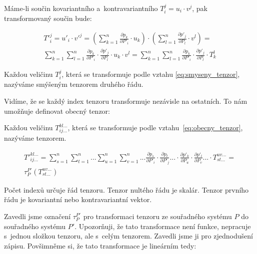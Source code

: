 Máme-li součin kovariantního a~kontravariantního \(T_i^j = u_i \cdot v^j\), pak transformovaný součin bude:

\begin{equation}
\label{eq:smyseny_tenzor}
\begin{split}
T'^j_i = u'_i \cdot v'^j = (\sum_{k=1}^n \frac{\partial p_k}{\partial P'_i} \cdot u_k) \cdot (\sum_{l=1}^n \frac{\partial p'_j}{\partial P_l} \cdot v^l) = \\
\sum_{k=1}^n \sum_{l=1}^n \frac{\partial p_k}{\partial P'_i} \cdot \frac{\partial p'_j}{\partial P_l} \cdot u_k \cdot v^l = \sum_{k=1}^n \sum_{l=1}^n \frac{\partial p_k}{\partial P'_i} \cdot \frac{\partial p'_j}{\partial P_l} \cdot T_k^l
\end{split}
\end{equation}

Každou veličinu \(T_i^j\), která se transformuje podle vztahu \eqref{eq:smyseny_tenzor}, nazýváme smýšeným tenzorem druhého řádu.

Vidíme, že se každý index tenzoru transformuje nezávisle na ostatních. To nám umožňuje definovat obecný tenzor:

\begin{fact}

Každou veličinu \(T_{ij...}^{kl...}\), která se transformuje podle vztahu~\eqref{eq:obecny_tenzor}, nazýváme tenzorem.

\begin{equation}
\label{eq:obecny_tenzor}
\begin{split}
T'^{kl...}_{ij...} = \sum_{s=1}^n \sum_{t=1}^n ... \sum_{u=1}^n \sum_{v=1}^n ... \frac{\partial p_s}{\partial P'_i} \cdot \frac{\partial p_t}{\partial P'_j} ... \cdot \frac{\partial p'_k}{\partial P_u} \cdot \frac{\partial p'_l}{\partial P_v} ... \cdot T_{st...}^{uv...} = \\
\tau_{P}^{P'} (T_{st...}^{uv...})
\end{split}
\end{equation}

\end{fact}

Počet indexů určuje řád tenzoru. Tenzor nultého řádu je skalár. Tenzor prvního řádu je kovariantní nebo kontravariantní vektor.

Zavedli jsme označení \(\tau_{P}^{P'}\) pro transformaci tenzoru ze souřadného systému \(P\) do souřadného systému \(P'\). Upozorňuji, že tato transformace není funkce, nepracuje s~jednou složkou tenzoru, ale s~celým tenzorem. Zavedli jsme ji pro zjednodušení zápisu. Povšimněme si, že tato transformace je lineárním tedy:

